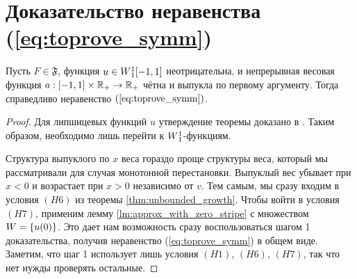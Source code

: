 \section{Доказательство неравенства (\ref{eq:toprove_symm})}

\begin{thm}
Пусть $F \in \mathfrak{F}$, функция $u \in W{}_1^1[-1, 1]$ неотрицательна,
и непрерывная весовая функция $a: [-1, 1] \times \mathbb R_+ \to \mathbb R_+$ чётна и выпукла по первому аргументу.
Тогда справедливо неравенство $(\ref{eq:toprove_symm})$.
\end{thm}

\begin{proof}
Для липшицевых функций $u$ утверждение теоремы доказано в \cite{Brock}.
Таким образом, необходимо лишь перейти к $W{}_1^1$-функциям.

Структура выпуклого по $x$ веса гораздо проще структуры веса,
который мы рассматривали для случая монотонной перестановки.
Выпуклый вес убывает при $x < 0$ и возрастает при $x > 0$ независимо от $v$.
Тем самым, мы сразу входим в условия $(H6)$ из теоремы \ref{thm:unbounded_growth}.
Чтобы войти в условия $(H7)$, применим лемму \ref{lm:approx_with_zero_stripe} с множеством $W = \{u(0)\}$.
Это дает нам возможность сразу воспользоваться шагом 1 доказательства,
получив неравенство (\ref{eq:toprove_symm}) в общем виде.
Заметим, что шаг 1 использует лишь условия $(H1)$, $(H6)$, $(H7)$, так что нет нужды проверять остальные.
\end{proof}
